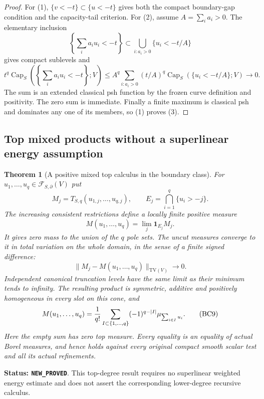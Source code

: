 \documentclass[11pt,a4paper]{article}
\numberwithin{equation}{section}
\newtheorem{theorem}{Theorem}[section]
\theoremstyle{definition}
\theoremstyle{remark}
\begin{document}
\begin{proof}
For (1), $\{v<-t\}\subset\{u<-t\}$ gives both the compact
boundary-gap condition and the capacity-tail criterion.
For (2), assume $A=\sum_i a_i>0$. The elementary inclusion
\[
 \left\{\sum_i a_i u_i<-t\right\}
                  \subset\bigcup_{i:a_i>0}\{u_i<-t/A\}
 \tag{BC6}
\]
gives compact sublevels and
\[
 t^q\operatorname{Cap}_S
          \left(\left\{\sum_i a_i u_i<-t\right\};V\right)
 \leq A^q\sum_{i:a_i>0}
       (t/A)^q\operatorname{Cap}_S(\{u_i<-t/A\};V)
                       \longrightarrow0.
\]
The sum is an extended classical psh function by the frozen
curve definition and positivity. The zero sum is immediate.
Finally a finite maximum is classical psh and dominates any one
of its members, so (1) proves (3).
\end{proof}

\subsection{Top mixed products without a superlinear energy assumption}

\begin{theorem}[A positive mixed top calculus in the boundary class]
\label{thm:r11-boundary-mixed-top-calculus}
For $u_1,\ldots,u_q\in\mathcal F_{S,\partial}(V)$ put
\[
 M_j=T_{S,q}(u_{1,j},\ldots,u_{q,j}),\qquad
 E_j=\bigcap_{i=1}^q\{u_i>-j\}.
\]
The increasing consistent restrictions define a locally finite
positive measure
\[
            M(u_1,\ldots,u_q)=\lim_j\mathbf1_{E_j}M_j.
 \tag{BC7}
\]
It gives zero mass to the union of the $q$ pole sets. The uncut
measures converge to it in total variation on the whole domain,
in the sense of a finite signed difference:
\[
               \|M_j-M(u_1,\ldots,u_q)\|_{\mathrm{TV}(V)}
                                           \longrightarrow0.
 \tag{BC8}
\]
Independent canonical truncation levels have the same limit as
their minimum tends to infinity. The resulting product is symmetric,
additive and positively homogeneous in every slot on this cone, and
\[
 M(u_1,\ldots,u_q)
   ={1\over q!}\sum_{I\subset\{1,\ldots,q\}}
        (-1)^{q-|I|}\mu_{\sum_{i\in I}u_i}.
 \tag{BC9}
\]
Here the empty sum has zero top measure. Every equality is an
equality of actual Borel measures, and hence holds against every
original compact smooth scalar test and all its actual refinements.
\end{theorem}

\noindent\textbf{Status: \texttt{NEW\_PROVED}}. This top-degree
result requires no superlinear weighted energy estimate and does
not assert the corresponding lower-degree recursive calculus.
\end{document}

